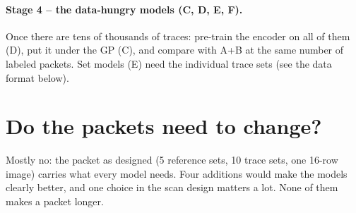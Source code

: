 \documentclass[10pt]{article}
\begin{document}
\paragraph{Stage 4 -- the data-hungry models (C, D, E, F).} Once there are tens of thousands of traces: pre-train the encoder on all of them
(D), put it under the GP (C), and compare with A+B at the same number of labeled packets. Set models (E) need the individual trace sets
(see the data format below).

\section{Do the packets need to change?}
\label{sec:dataneeds}

\begin{basic}
Mostly no: the packet as designed (5 reference sets, 10 trace sets, one 16-row image) carries what every model needs. Four additions
would make the models clearly better, and one choice in the scan design matters a lot. None of them makes a packet longer.
\end{basic}
\end{document}
